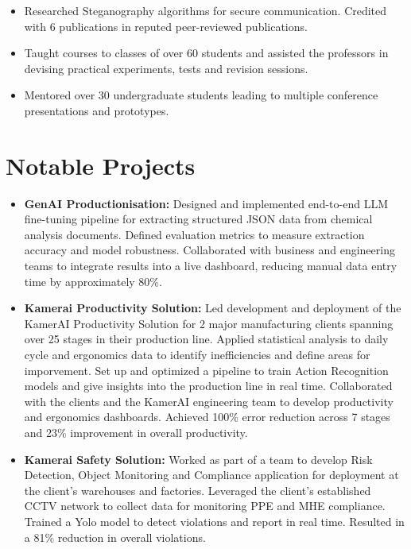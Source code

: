 \documentclass[a4paper,11pt]{article}
\begin{document}
      \begin{itemize}[leftmargin=*, itemsep = -2pt]
        \item {Researched Steganography algorithms for secure communication. Credited with 6 publications in reputed peer-reviewed publications.}
        \item {Taught courses to classes of over 60 students and assisted the professors in devising practical experiments, tests and revision sessions.}
        \item {Mentored over 30 undergraduate students leading to multiple conference presentations and prototypes.}
      \end{itemize}

\section{Notable Projects}
  \begin{itemize}[leftmargin=*, itemsep = -2pt]
    \item {\textbf{GenAI Productionisation:}} Designed and implemented end-to-end LLM fine-tuning pipeline for extracting structured JSON data from chemical analysis documents. Defined evaluation metrics to measure extraction accuracy and model robustness. Collaborated with business and engineering teams to integrate results into a live dashboard, reducing manual data entry time by approximately 80\%.
    \item {\textbf{Kamerai Productivity Solution:} Led development and deployment of the KamerAI Productivity Solution for 2 major manufacturing clients spanning over 25 stages in their production line. Applied statistical analysis to daily cycle and ergonomics data to identify inefficiencies and define areas for imporvement. Set up and optimized a pipeline to train Action Recognition models and give insights into the production line in real time. Collaborated with the clients and the KamerAI engineering team to develop productivity and ergonomics dashboards. Achieved 100\% error reduction across 7 stages and 23\% improvement in overall productivity.}
    \item {\textbf{Kamerai Safety Solution:} Worked as part of a team to develop Risk Detection, Object Monitoring and Compliance application for deployment at the client's warehouses and factories. Leveraged the client's established CCTV network to collect data for monitoring PPE and MHE compliance. Trained a Yolo model to detect violations and report in real time. Resulted in a 81\% reduction in overall violations.}
    
 
  \end{itemize}
\end{document}
